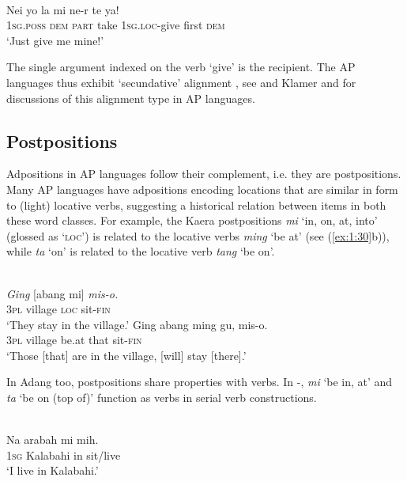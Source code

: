 \ea%
\label{ex:1:29}
   \\
\gll Nei  yo  la  mi  ne-r  te  ya! \\
\textsc{1sg.poss}  \textsc{dem}  \textsc{part} take  1\textsc{sg.loc}{}-give  first  \textsc{dem}    \\
\glt `Just give me mine!' 
\z
 
The single argument indexed on the verb `give' is the recipient. The AP languages thus exhibit `secundative' alignment \citep{Dryer1986}, see \citet{Klamer2010ditransitive} and Klamer and \citet{Schapper2012} for discussions of this alignment type in AP languages.

\subsection{Postpositions}\label{sec:1:5.6}
Adpositions in AP languages follow their complement, i.e. they are postpositions. Many AP languages have adpositions encoding locations that are similar in form to (light) locative verbs, suggesting a historical relation between items in both these word classes. For example, the Kaera postpositions \textit{mi} `in, on, at, into' (glossed as `\textsc{loc')}  is related to the locative verbs \textit{ming} `be at' (see (\ref{ex:1:30}b)), while \textit{ta} `on' is related to the locative verb \textit{tang} `be on'. 



\ea%
\label{ex:1:30}
\ea
{}\\
\gll \textit{Ging} [abang  mi]  \textit{mis-o.}  \\
  \textsc{3pl} village  \textsc{loc} sit-\textsc{fin}  \\
\glt `They stay in the village.' 
\ex
\gll Ging  abang   ming  gu,   mis-o. \\
\textsc{3pl} village  be.at  that  sit-\textsc{fin}   \\
\glt `Those [that] are in the village, [will] stay [there].'
\z\z
 
 


In Adang too, postpositions share properties with verbs. In -, \textit{mi} `be in, at' and \textit{ta} `be on (top of)' function as verbs in serial verb constructions. 



\ea%
\label{ex:1:31}
\\
\gll Na  {\textglotstop}arabah  mi  mih. \\
\textsc{1sg} Kalabahi  in   sit/live      \\
\glt `I live in Kalabahi.' 
\z
 

